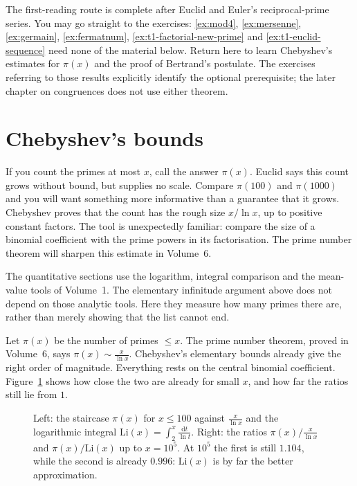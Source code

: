\begin{reminder}
The first-reading route is complete after Euclid and Euler's reciprocal-prime
series. You may go straight to the exercises:
\ref{ex:mod4}, \ref{ex:mersenne}, \ref{ex:germain},
\ref{ex:fermatnum}, \ref{ex:t1-factorial-new-prime} and
\ref{ex:t1-euclid-sequence} need none of the material below.
Return here to learn Chebyshev's estimates for $\pi(x)$ and the proof of
Bertrand's postulate. The exercises referring to those results explicitly
identify the optional prerequisite; the later chapter on congruences does
not use either theorem.
\end{reminder}

\section{Chebyshev's bounds}

If you count the primes at most $x$, call the answer $\pi(x)$. Euclid says this count grows without bound, but supplies no scale. Compare $\pi(100)$ and $\pi(1000)$ and you will want something more informative than a guarantee that it grows. Chebyshev proves that the count has the rough size $x/\ln x$, up to positive constant factors. The tool is unexpectedly familiar: compare the size of a binomial coefficient with the prime powers in its factorisation. The prime number theorem will sharpen this estimate in Volume~6.

The quantitative sections use the logarithm, integral comparison and the
mean-value tools of Volume~1. The elementary infinitude argument above does
not depend on those analytic tools. Here they measure how many primes there
are, rather than merely showing that the list cannot end.


Let $\pi(x)$ be the number of primes $\le x$. The prime number theorem, proved in Volume~6, says $\pi(x)\sim\frac x{\ln x}$. Chebyshev's elementary bounds already give the right order of magnitude. Everything rests on the central binomial coefficient. Figure~\ref{fig:primecount} shows how close the two are already for small $x$, and how far the ratios still lie from $1$.

\begin{figure}[ht]
\centering
{}
\caption{Left: the staircase $\pi(x)$ for $x\le100$ against $\frac x{\ln x}$ and the logarithmic integral $\mathrm{Li}(x)=\int_2^x\frac{\mathrm dt}{\ln t}$. Right: the ratios $\pi(x)\big/\frac x{\ln x}$ and $\pi(x)/\mathrm{Li}(x)$ up to $x=10^5$. At $10^5$ the first is still $1.104$, while the second is already $0.996$: $\mathrm{Li}(x)$ is by far the better approximation.}
\label{fig:primecount}
\end{figure}

